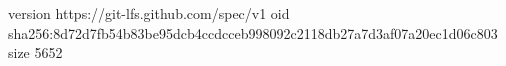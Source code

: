 version https://git-lfs.github.com/spec/v1
oid sha256:8d72d7fb54b83be95dcb4ccdcceb998092c2118db27a7d3af07a20ec1d06c803
size 5652
